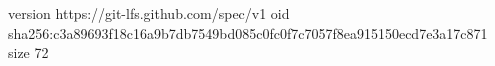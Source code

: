 version https://git-lfs.github.com/spec/v1
oid sha256:c3a89693f18c16a9b7db7549bd085c0fc0f7c7057f8ea915150ecd7e3a17c871
size 72
